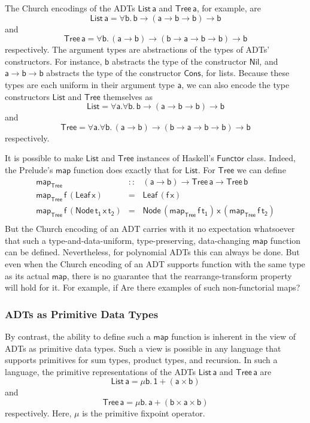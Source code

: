 \documentclass[acmsmall,screen,review,anonymous]{acmart}
\theoremstyle{definition}
\begin{document}
The Church encodings of the ADTs $\mathsf{List\,a}$ and
$\mathsf{Tree\,a}$, for example, are
\[\mathsf{List\,a} = \mathsf{\forall b.\,b \to (a \to b \to b) \to b}\]
and 
\[\mathsf{Tree\,a} = \mathsf{\forall b.\,(a \to b) \to (b \to a \to b
  \to b) \to b}\] respectively. The argument types are abstractions
of the types of ADTs' constructors. For instance, $\mathsf{b}$
abstracts the type of the constructor $\mathsf{Nil}$, and $\mathsf{a
  \to b \to b}$ abstracts the type of the constructor $\mathsf{Cons}$,
for lists. Because these types are each uniform in their argument type
$\mathsf{a}$, we can also encode the type constructors $\mathsf{List}$
and $\mathsf{Tree}$ themselves as
\[\mathsf{List} = \mathsf{\forall a. \forall b.\,b \to (a \to b \to b)
  \to b}\] 
and 
\[\mathsf{Tree} = \mathsf{\forall a. \forall b.\,(a \to b) \to (b \to
  a \to b \to b) \to b}\]
respectively. 

It is possible to make $\mathsf{List}$ and $\mathsf{Tree}$ instances
of Haskell's $\mathsf{Functor}$ class. Indeed, the Prelude's
$\mathsf{map}$ function does exactly that for $\mathsf{List}$. For
$\mathsf{Tree}$ we can define
\[\begin{array}{lll}
\mathsf{map_{Tree}} & \mathsf{::} & \mathsf{(a \to b) \to Tree\,a \to Tree \,b}\\
\mathsf{map_{Tree}\, f\, (Leaf\,x)} & \mathsf{=} & \mathsf{Leaf\,(f\,x)}\\
\mathsf{map_{Tree}\, f\, (Node\,t_1\,x\,t_2)} & \mathsf{=} &
\mathsf{Node\,(map_{Tree}\, f \,t_1)\,x\,(map_{Tree}\,f\,t_2)}\\
\end{array}\]
But the Church encoding of an ADT carries with it no expectation
whatsoever that such a type-and-data-uniform, type-preserving,
data-changing $\mathsf{map}$ function can be defined. Nevertheless,
for polynomial ADTs this can always be done. But even when the Church
encoding of an ADT supports function with the same type as its actual
$\mathsf{map}$, there is no guarantee that the rearrange-transform
property will hold for it. For example, if {\color{violet} Are there
  examples of such non-functorial maps?}

\subsubsection{ADTs as Primitive Data Types}

By contrast, the ability to define such a $\mathsf{map}$ function is
inherent in the view of ADTs as primitive data types. Such a view is
possible in any language that supports primitives for sum types,
product types, and recursion. In such a language, the primitive
representations of the ADTs $\mathsf{List\,a}$ and $\mathsf{Tree\,a}$
are
\[\mathsf{List\,a} = \mathsf{\mu b.\, 1 + (a \times b)}\] 
and 
\[\mathsf{Tree\,a} = \mathsf{\mu b.\, a + (b \times a \times b)}\]
respectively. Here, $\mathsf{\mu}$ is the primitive fixpoint
operator.
\end{document}
